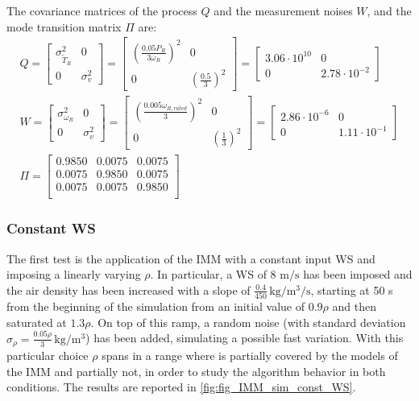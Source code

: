 The covariance matrices of the process $Q$ and the measurement noises $W$, and the mode transition matrix $\Pi$ are:
\begin{gather}
  Q = \begin{bmatrix}
    \sigma_{\tilde{T}_R}^2 & 0 \\
    0 & \sigma_v^2
  \end{bmatrix} =
  \begin{bmatrix}
    \left(\frac{0.05 P_R}{3\omega_R}\right)^2 & 0 \\
    0 & \left(\frac{0.5}{3}\right)^2
  \end{bmatrix} =
  \begin{bmatrix}
    3.06\cdot10^{10} & 0 \\
    0 & 2.78\cdot10^{-2}
  \end{bmatrix} \\
  W = \begin{bmatrix}
    \sigma_{\omega_R}^2 & 0 \\
    0 & \sigma_{v}^2
  \end{bmatrix} =
  \begin{bmatrix}
    \left(\frac{0.005 \omega_{R,rated}}{3}\right)^2 & 0 \\
    0 & \left(\frac{1}{3}\right)^2
  \end{bmatrix} =
  \begin{bmatrix}
    2.86\cdot10^{-6} & 0 \\
    0 & 1.11\cdot10^{-1}
  \end{bmatrix} \\
  \Pi=
  \begin{bmatrix}
    0.9850  &  0.0075  &  0.0075\\
    0.0075  &  0.9850  &  0.0075\\
    0.0075  &  0.0075  &  0.9850\\
  \end{bmatrix}
\end{gather}

\subsubsection{Constant WS} 
The first test is the application of the IMM with a constant input WS and imposing a linearly varying $\rho$. In particular, a WS of 8 $\si{\meter\per\second}$ has been imposed and the air density has been increased with a slope of $\frac{0.4}{450} \, \si{\kilo\gram\per\cubic\meter\per\second}$, starting at 50 s from the beginning of the simulation from an initial value of $0.9\rho$ and then saturated at $1.3\rho$. On top of this ramp, a random noise (with standard deviation $\sigma_{\rho}=\frac{0.05\rho}{3} \, \si{\kilo\gram\per\cubic\meter}$) has been added, simulating a possible fast variation. With this particular choice $\rho$ spans in a range where is partially covered by the models of the IMM and partially not, in order to study the algorithm behavior in both conditions. The results are reported in \autoref{fig:fig_IMM_sim_const_WS}.

